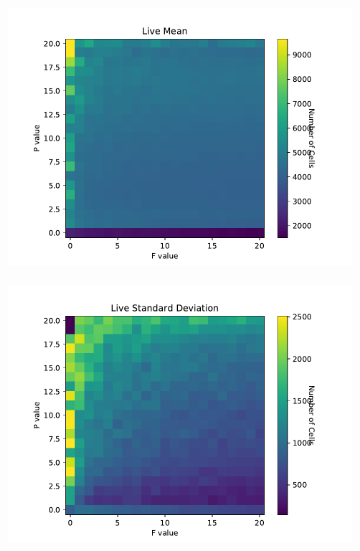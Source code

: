 \documentclass{article}
\begin{document}
\begin{figure}[H]
\centering
\begin{subfigure}{.5\textwidth}
    \centering
    \includegraphics[scale=0.4]{Live Mean 2.pdf}
    \label{fig:livemean3D}
\end{subfigure}%
\begin{subfigure}{.5\textwidth}
    \centering
    \includegraphics[scale=0.4]{Live STD 2.pdf}
    \label{fig:livestd}
\end{subfigure}
\end{figure}
\end{document}
